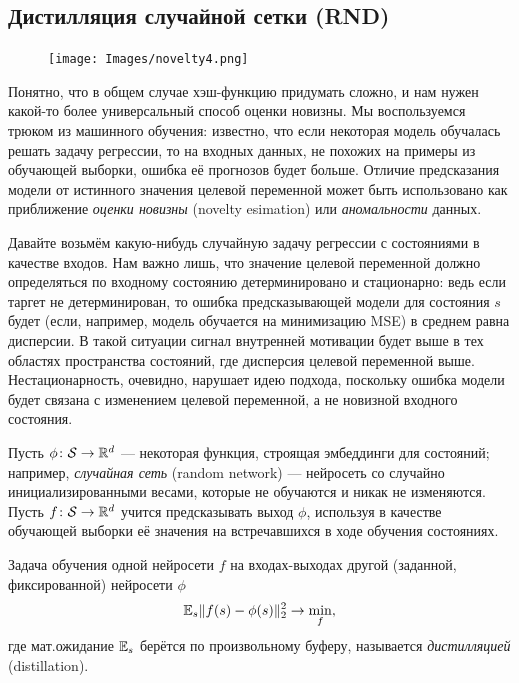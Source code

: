\subsection{Дистилляция случайной сетки (RND)}

\begin{figure}
\vspace{-0.4cm}
\centering
\texttt{[image: Images/novelty4.png]}
\vspace{-0.5cm}
\end{figure}

Понятно, что в общем случае хэш-функцию придумать сложно, и нам нужен какой-то более универсальный способ оценки новизны. Мы воспользуемся трюком из машинного обучения: известно, что если некоторая модель обучалась решать задачу регрессии, то на входных данных, не похожих на примеры из обучающей выборки, ошибка её прогнозов будет больше. Отличие предсказания модели от истинного значения целевой переменной может быть использовано как приближение \emph{оценки новизны} (novelty esimation) или \emph{аномальности} данных.

Давайте возьмём какую-нибудь случайную задачу регрессии с состояниями в качестве входов. Нам важно лишь, что значение целевой переменной должно определяться по входному состоянию детерминировано и стационарно: ведь если таргет не детерминирован, то ошибка предсказывающей модели для состояния $s$ будет (если, например, модель обучается на минимизацию MSE) в среднем равна дисперсии. В такой ситуации сигнал внутренней мотивации будет выше в тех областях пространства состояний, где дисперсия целевой переменной выше. Нестационарность, очевидно, нарушает идею подхода, поскольку ошибка модели будет связана с изменением целевой переменной, а не новизной входного состояния. 

Пусть $\phi \colon \mathcal{S} \to \mathbb{R}^d$ --- некоторая функция, строящая эмбеддинги для состояний; например, \emph{случайная сеть} (random network) --- нейросеть со случайно инициализированными весами, которые не обучаются и никак не изменяются. Пусть $f \colon \mathcal{S} \to \mathbb{R}^d$ учится предсказывать выход $\phi$, используя в качестве обучающей выборки её значения на встречавшихся в ходе обучения состояниях.

\begin{definition}
Задача обучения одной нейросети $f$ на входах-выходах другой (заданной, фиксированной) нейросети $\phi$
$$\mathbb{E}_s \|f(s) - \phi(s)\|_2^2 \to \min_{f},$$
где мат.ожидание $\mathbb{E}_s$ берётся по произвольному буферу, называется \emph{дистилляцией} (distillation).
\end{definition}


